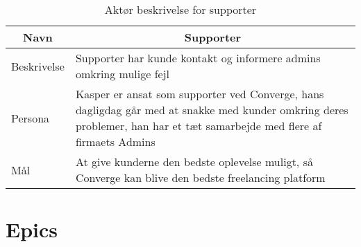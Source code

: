 \begin{table}[H]
    \begin{small}
        \caption{Aktør beskrivelse for supporter}
        \label{tab:supporter}
        \begin{center}
            \begin{tabular}[c]{l|l}
                \multicolumn{1}{c|}{\textbf{Navn}} & \multicolumn{1}{c}{\textbf{Supporter}}                                                                                                                                                            \\
                \hline
                Beskrivelse                        & \multicolumn{1}{p{10cm}}{Supporter har kunde kontakt og informere admins omkring mulige fejl}                                                                                                     \\
                \hline
                Persona                            & \multicolumn{1}{p{10cm}}{Kasper er ansat som supporter ved Converge, hans dagligdag går med at snakke med kunder omkring deres problemer, han har et tæt samarbejde med flere af firmaets Admins} \\
                \hline
                Mål                                & \multicolumn{1}{p{10cm}}{At give kunderne den bedste oplevelse muligt, så Converge kan blive den bedste freelancing platform}                                                                     \\
            \end{tabular}
        \end{center}
    \end{small}
\end{table}

\section{Epics}

